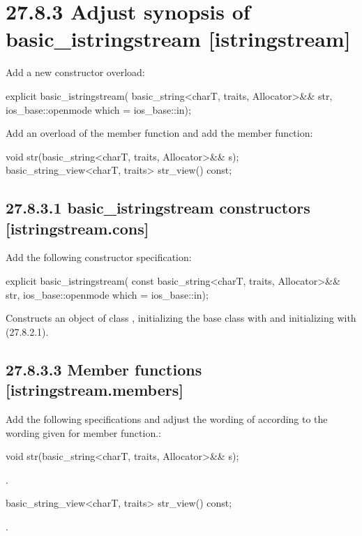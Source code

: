 \documentclass[ebook,11pt,article]{memoir}
\begin{document}
\section{27.8.3 Adjust synopsis of basic\_istringstream [istringstream]}
Add a new constructor overload:
\begin{codeblock}
           explicit basic_istringstream(
             basic_string<charT, traits, Allocator>&& str,
             ios_base::openmode which = ios_base::in);
\end{codeblock}

Add an overload of the  member function and add the  member function:
\begin{codeblock}
void str(basic_string<charT, traits, Allocator>&& s);
basic_string_view<charT, traits> str_view() const;
\end{codeblock}

\subsection{27.8.3.1 basic\_istringstream constructors [istringstream.cons]}
Add the following constructor specification:
\begin{itemdecl}
explicit basic_istringstream(
  const basic_string<charT, traits, Allocator>&& str,
  ios_base::openmode which = ios_base::in);
\end{itemdecl}
\begin{itemdescr}
\pnum
\effects Constructs an object of class , initializing the base class with  and initializing  with  (27.8.2.1).
\end{itemdescr}
\subsection{27.8.3.3 Member functions [istringstream.members]}
Add the following specifications and adjust the wording of  according to the wording given for  member function.:
\begin{itemdecl}
void str(basic_string<charT, traits, Allocator>&& s);
\end{itemdecl}
\begin{itemdescr}
\pnum
\effects {}.
\end{itemdescr}
\begin{itemdecl}
basic_string_view<charT, traits> str_view() const;
\end{itemdecl}
\begin{itemdescr}
\pnum
\returns {}.
\end{itemdescr}
\end{document}

